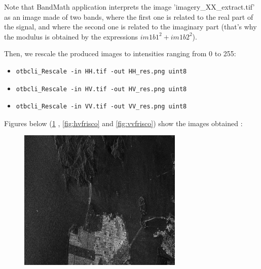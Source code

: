 Note that BandMath application interprets the image 'imagery\_XX\_extract.tif'
as an image made of two bands, where the first one is related to the real part
of the signal, and where the second one is related to the imaginary part (that's
why the modulus is obtained by the expressions $im1b1^2+im1b2^2$).

Then, we rescale the produced images to intensities ranging from 0 to 255:

\begin{itemize}
\item 
\begin{verbatim} 
otbcli_Rescale -in HH.tif -out HH_res.png uint8 
\end{verbatim}
									  
\item 
\begin{verbatim} 
otbcli_Rescale -in HV.tif -out HV_res.png uint8 
\end{verbatim}
									  
\item 
\begin{verbatim} 
otbcli_Rescale -in VV.tif -out VV_res.png uint8 
\end{verbatim}
\end{itemize}

Figures below (\ref{fig:hhfrisco} , \ref{fig:hvfrisco} and \ref{fig:vvfrisco}) show the images obtained :
\begin{figure}[!h]
\center
\includegraphics[width=0.7\textwidth]{../Art/RSAT2_HH_Frisco.png}
\label{fig:hhfrisco}
\end{figure}


